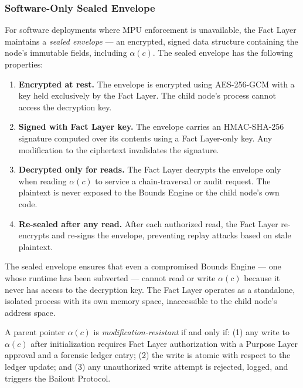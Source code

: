 \subsubsection{Software-Only Sealed Envelope}
\label{sec:software-sealed-envelope}

For software deployments where MPU enforcement is unavailable, the Fact Layer maintains a \emph{sealed envelope} — an encrypted, signed data structure containing the node's immutable fields, including $\alpha(c)$. The sealed envelope has the following properties:

\begin{enumerate}
    \item \textbf{Encrypted at rest.} The envelope is encrypted using AES-256-GCM with a key held exclusively by the Fact Layer. The child node's process cannot access the decryption key.

    \item \textbf{Signed with Fact Layer key.} The envelope carries an HMAC-SHA-256 signature computed over its contents using a Fact Layer-only key. Any modification to the ciphertext invalidates the signature.

    \item \textbf{Decrypted only for reads.} The Fact Layer decrypts the envelope only when reading $\alpha(c)$ to service a chain-traversal or audit request. The plaintext is never exposed to the Bounds Engine or the child node's own code.

    \item \textbf{Re-sealed after any read.} After each authorized read, the Fact Layer re-encrypts and re-signs the envelope, preventing replay attacks based on stale plaintext.
\end{enumerate}

The sealed envelope ensures that even a compromised Bounds Engine — one whose runtime has been subverted — cannot read or write $\alpha(c)$ because it never has access to the decryption key. The Fact Layer operates as a standalone, isolated process with its own memory space, inaccessible to the child node's address space.

\begin{dfn}
\label{dfn:modification-resistance}
A parent pointer $\alpha(c)$ is \emph{modification-resistant} if and only if: (1) any write to $\alpha(c)$ after initialization requires Fact Layer authorization with a Purpose Layer approval and a forensic ledger entry; (2) the write is atomic with respect to the ledger update; and (3) any unauthorized write attempt is rejected, logged, and triggers the Bailout Protocol.
\end{dfn}

